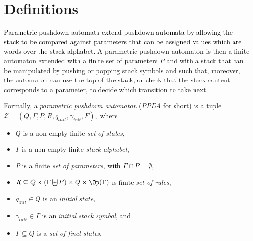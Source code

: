 \section{Definitions}\label{section def ppda}

\textcolor{black}{Parametric pushdown automata extend pushdown automata by allowing the stack to be compared against parameters that can be assigned values which are words over the stack alphabet.}
A parametric pushdown automaton is then a finite automaton extended with a finite set of parameters $P$  and with a stack that can be manipulated by pushing or popping stack symbols and such that, moreover, the automaton can use the top of the stack, or check that the stack content corresponds to a parameter,  to decide which transition to take next.\\

\par\noindent\ignorespacesafterend
Formally, a {\em parametric pushdown automaton} ({\em PPDA} for short) 
is a tuple 
$\mathcal{Z} = (Q, \Gamma, P, R, q_{init},\gamma_{init}, F),$ where
\begin{itemize}
\item $Q$ is a non-empty finite {\em set of  states},
\item $\Gamma$ is a non-empty finite {\em  stack alphabet},
\item $P$ is a finite {\em   set of parameters}, \textcolor{black}{with $\Gamma \cap P = \emptyset$},
 \item  $R   \subseteq  Q  \times (\Gamma \biguplus P)  \times Q  \times \Op(\Gamma)$ is finite {\em  set of rules},
\item $q_{init}\in Q$ is an {\em initial  state}, 
\item $ \gamma_{init} \in \Gamma$ is an {\em initial stack symbol}, and
\item $F\subseteq Q$ is a {\em set of final  states}.
\end{itemize}

